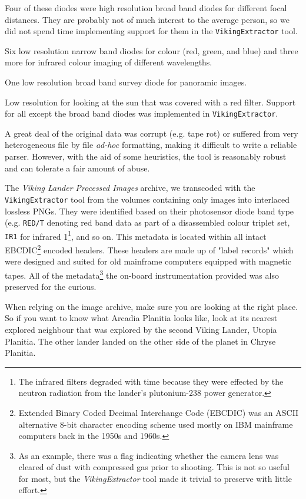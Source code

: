 Four of these diodes were high resolution broad band diodes for different focal distances. They are probably not of much interest to the average person, so we did not spend time implementing support for them in the {\tt VikingExtractor} tool. 

Six low resolution narrow band diodes for colour (red, green, and blue) and three more for infrared colour imaging of different wavelengths.

One low resolution broad band survey diode for panoramic images.

Low resolution for looking at the sun that was covered with a red filter. Support for all except the broad band diodes was implemented in {\tt VikingExtractor}. 

A great deal of the original data was corrupt (e.g. tape rot) or suffered from very heterogeneous file by file {\it ad-hoc} formatting, making it difficult to write a reliable parser. However, with the aid of some heuristics, the tool is reasonably robust and can tolerate a fair amount of abuse.

The {\it Viking Lander Processed Images} archive, we transcoded with the {\tt VikingExtractor} tool from the volumes containing only images into interlaced lossless PNGs. They were identified based on their photosensor diode band type (e.g. {\tt RED/T} denoting red band data as part of a disassembled colour triplet set, {\tt IR1} for infrared 1\footnote{The infrared filters degraded with time because they were effected by the neutron radiation from the lander's plutonium-238 power generator.}, and so on. This metadata is located within all intact EBCDIC\footnote{Extended Binary Coded Decimal Interchange Code (EBCDIC) was an ASCII alternative 8-bit character encoding scheme used mostly on IBM mainframe computers back in the 1950s and 1960s.} encoded headers. These headers are made up of "label records" which were designed and suited for old mainframe computers equipped with magnetic tapes. All of the metadata\footnote{As an example, there was a flag indicating whether the camera lens was cleared of dust with compressed gas prior to shooting. This is not so useful for most, but the {\it VikingExtractor} tool made it trivial to preserve with little effort.} the on-board instrumentation provided was also preserved for the curious.

When relying on the image archive, make sure you are looking at the right place. So if you want to know what Arcadia Planitia looks like, look at its nearest explored neighbour that was explored by the second Viking Lander, Utopia Planitia. The other lander landed on the other side of the planet in Chryse Planitia.

\StopChapter

